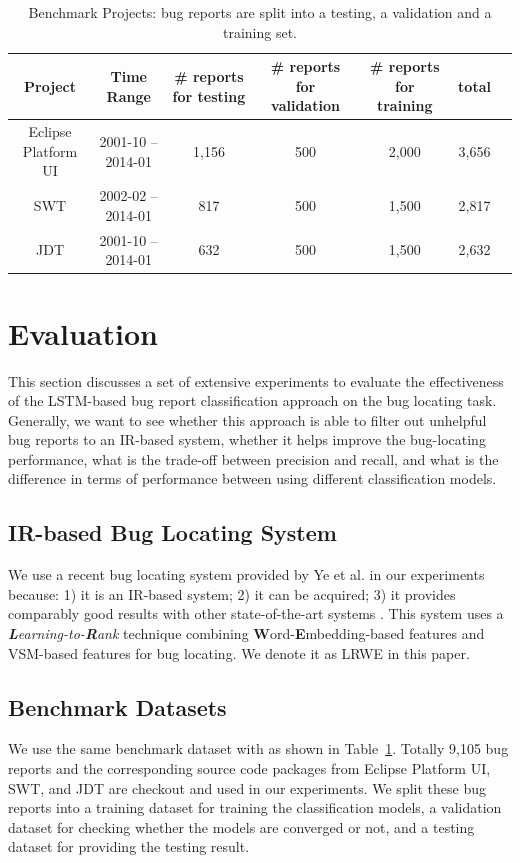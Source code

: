 \begin{table}[t]
\centering
\caption{Benchmark Projects: {bug reports are split into a testing, a validation and a training set.}}
\begin{tabular}{|c|c|c|c|c|c|c|} \hline
Project&Time Range&\# reports for testing &\# reports for validation&\# reports for training&total\\ \hline
Eclipse Platform UI &2001-10 -- 2014-01&1,156&500&2,000&3,656\\ \hline
SWT&2002-02 -- 2014-01&817&500&1,500&2,817\\ \hline
JDT&2001-10 -- 2014-01&632&500&1,500&2,632\\ \hline
\end{tabular}
\label{tab:dataset}
\end{table}

\section{Evaluation}
\label{sec:evaluation}

This section discusses a set of extensive experiments to evaluate the effectiveness of the LSTM-based bug report classification approach on the bug locating task. Generally, we want to see whether this approach is able to filter out unhelpful bug reports to an IR-based system, whether it helps improve the bug-locating performance, what is the trade-off between precision and recall, and what is the difference in terms of performance between using different classification models.

\subsection{IR-based Bug Locating System}
\label{sec:bug locating system}
We use a recent bug locating system provided by Ye et al. \cite{Ye:ICSE16} in our experiments because: 1) it is an IR-based system; 2) it can be acquired; 3) it provides comparably good results with other state-of-the-art systems \cite{7372035, 7961519}. This system uses a \textit{\textbf{L}earning-to-\textbf{R}ank} technique combining \textbf{W}ord-\textbf{E}mbedding-based features and VSM-based features for bug locating. We denote it as LRWE in this paper.

\subsection{Benchmark Datasets}
\label{sec:benchmark dataset}
We use the same benchmark dataset with \cite{Ye:FSE14, Ye:ICSE16, 7372035, 7961519, 7832908} as shown in Table~\ref{tab:dataset}. Totally 9,105 bug reports and the corresponding source code packages from Eclipse Platform UI, SWT, and JDT are checkout and used in our experiments. We split these bug reports into a training dataset for training the classification models, a validation dataset for checking whether the models are converged or not, and a testing dataset for providing the testing result.

